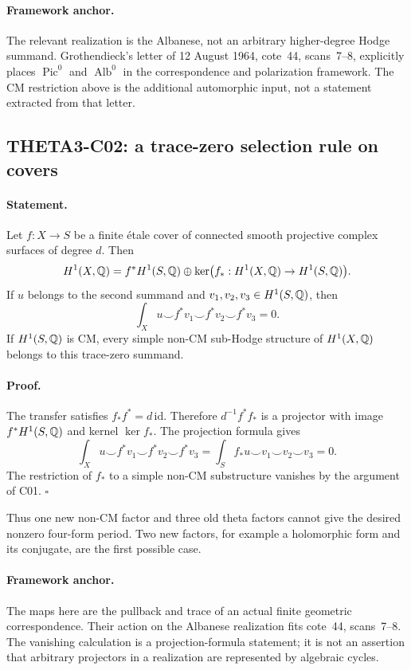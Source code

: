 \paragraph{Framework anchor.}
The relevant realization is the Albanese, not an arbitrary higher-degree
Hodge summand.  Grothendieck's letter of 12 August 1964, cote~44,
scans~7--8, explicitly places $\operatorname{Pic}^0$ and
$\operatorname{Alb}^0$ in the correspondence and polarization framework.
The CM restriction above is the additional automorphic input, not a
statement extracted from that letter.

\subsection{THETA3-C02: a trace-zero selection rule on covers}\label{C02}

\paragraph{Statement.}
Let $f:X\to S$ be a finite \'etale cover of connected smooth
projective complex surfaces of degree $d$. Then
\[
 H^1(X,\mathbb Q)=f^*H^1(S,\mathbb Q)\oplus
       \ker\bigl(f_*:H^1(X,\mathbb Q)\to H^1(S,\mathbb Q)\bigr).
\]
If $u$ belongs to the second summand and $v_1,v_2,v_3\in H^1(S,\mathbb Q)$,
then
\[
 \int_Xu\smile f^*v_1\smile f^*v_2\smile f^*v_3=0.
\]
If $H^1(S,\mathbb Q)$ is CM, every simple non-CM sub-Hodge structure of
$H^1(X,\mathbb Q)$ belongs to this trace-zero summand.

\paragraph{Proof.}
The transfer satisfies $f_*f^*=d\,\mathrm{id}$. Therefore
$d^{-1}f^*f_*$ is a projector with image $f^*H^1(S,\mathbb Q)$ and kernel
$\ker f_*$. The projection formula gives
\[
 \int_Xu\smile f^*v_1\smile f^*v_2\smile f^*v_3
 =\int_S f_*u\smile v_1\smile v_2\smile v_3=0.
\]
The restriction of $f_*$ to a simple non-CM substructure vanishes by
the argument of C01. $\square$

Thus one new non-CM factor and three old theta factors cannot give
the desired nonzero four-form period. Two new factors, for example a
holomorphic form and its conjugate, are the first possible case.

\paragraph{Framework anchor.}
The maps here are the pullback and trace of an actual finite geometric
correspondence.  Their action on the Albanese realization fits cote~44,
scans~7--8.  The vanishing calculation is a projection-formula statement;
it is not an assertion that arbitrary projectors in a realization are
represented by algebraic cycles.


